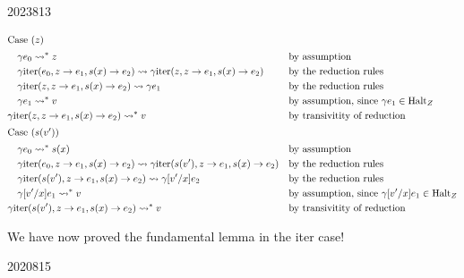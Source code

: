 \documentclass[10pt,\jkfside,a4paper]{article}
\begin{document}
\begin{enumerate}
\begin{examquestion}{2023}{8}{13}
\begin{enumerate}[label=$(\alph*)$]
            \begin{align*}
                \intertext{Case ($z$)}
                & \quad \gamma e_0 \rightsquigarrow^* z && \text{by assumption} \\
                & \quad \gamma \mathrm{iter}(e_0, z \to e_1, s(x) \to e_2) \rightsquigarrow \gamma \mathrm{iter}(z, z \to e_1, s(x) \to e_2) && \text{by the reduction
                rules}\\
                & \quad \gamma \mathrm{iter}(z, z \to e_1, s(x) \to e_2) \rightsquigarrow \gamma e_1 && \text{by the reduction rules} \\
                & \quad \gamma e_1 \rightsquigarrow^* v && \text{by assumption, since $\gamma e_1 \in \mathrm{Halt}_Z$} \\
                & \gamma \mathrm{iter}(z, z \to e_1, s(x) \to e_2) \rightsquigarrow^* v && \text{by transivitity of reduction} \\
                \intertext{Case ($s(v')$)}
                & \quad \gamma e_0 \rightsquigarrow^* s(x) && \text{by assumption} \\
                & \quad \gamma \mathrm{iter}(e_0, z \to e_1, s(x) \to e_2) \rightsquigarrow \gamma \mathrm{iter}(s(v'), z \to e_1, s(x) \to e_2) && \text{by the reduction
                rules}\\
                & \quad \gamma \mathrm{iter}(s(v'), z \to e_1, s(x) \to e_2) \rightsquigarrow \gamma [v'/x]e_2 && \text{by the reduction rules} \\
                & \quad \gamma [v'/x]e_1 \rightsquigarrow^* v && \text{by assumption, since $\gamma [v'/x]e_1 \in \mathrm{Halt}_Z$} \\
                & \gamma \mathrm{iter}(s(v'), z \to e_1, s(x) \to e_2) \rightsquigarrow^* v && \text{by transivitity of reduction} \\
            \end{align*}

            We have now proved the fundamental lemma in the iter case!

        \end{enumerate}

    \end{examquestion}

    \begin{examquestion}{2020}{8}{15}

        \begin{enumerate}[label=(\textit{\alph*})]

            \setcounter{enumii}{1}


\end{enumerate}
\end{examquestion}
\end{enumerate}
\end{document}
